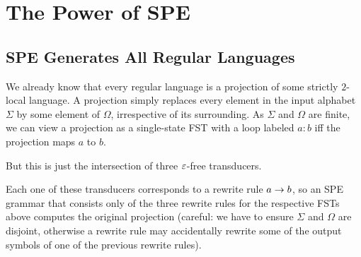 \section{The Power of SPE}

\subsection{SPE Generates All Regular Languages}

We already know that every regular language is a projection of some strictly $2$-local language.
A projection simply replaces every element in the input alphabet $\Sigma$ by some element of $\Omega$, irrespective of its surrounding.
As $\Sigma$ and $\Omega$ are finite, we can view a projection as a single-state FST with a loop labeled $a:b$ iff the projection maps $a$ to $b$.
%
\begin{center}
        
\end{center}
%
But this is just the intersection of three $\varepsilon$-free transducers.
%
\begin{center}
        
    \hspace{2em}
        
    \hspace{2em}
        
\end{center}
%
Each one of these transducers corresponds to a rewrite rule $a \rightarrow b$, so an SPE grammar that consists only of the three rewrite rules for the respective FSTs above computes the original projection (careful: we have to ensure $\Sigma$ and $\Omega$ are disjoint, otherwise a rewrite rule may accidentally rewrite some of the output symbols of one of the previous rewrite rules).
%
